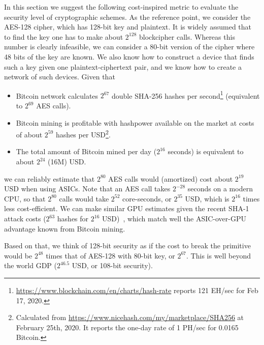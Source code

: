 \documentclass[a4paper]{article}
\begin{document}
In this section we suggest the following cost-inspired metric to evaluate the security level of cryptographic schemes. As the reference point, we consider the AES-128 cipher, which has 128-bit key and plaintext. It is widely assumed that to find the key one has to make about $2^{128}$ blockcipher calls. Whereas this number is clearly infeasible, we can consider a 80-bit version of the cipher where 48 bits of the key are known.  We also know how to construct a device that finds such a key given one plaintext-ciphertext pair, and we know how to create a network of such devices.
Given that
\begin{itemize}
    \item Bitcoin network calculates $2^{67}$ double SHA-256 hashes per second\footnote{\url{https://www.blockchain.com/en/charts/hash-rate} reports 121 EH/sec for Feb 17, 2020.} (equivalent to $2^{69}$ AES calls).
    \item Bitcoin mining is profitable with hashpower available on the market at costs of about $2^{59}$ hashes per USD\footnote{Calculated from \url{https://www.nicehash.com/my/marketplace/SHA256} at February 25th, 2020. It reports the one-day rate of 1 PH/sec for 0.0165 Bitcoin.}.
    \item The total amount of Bitcoin mined per day ($2^{16}$ seconds) is equivalent to about $2^{24}$ (16M) USD.
\end{itemize}
we can reliably estimate that $2^{80}$ AES calls would (amortized) cost about  $2^{19}$ USD when using ASICs. Note that an AES call takes $2^{-28}$ seconds on a modern CPU, so that $2^{80}$ calls would take $2^{52}$ core-seconds, or $2^{35}$ USD, which is $2^{16}$ times less cost-efficient. 
We can make similar GPU estimates given the recent SHA-1 attack costs ($2^{63}$ hashes for $2^{16}$ USD)~\cite{cryptoeprint:2020:014}, which match well the ASIC-over-GPU advantage known from Bitcoin mining.

Based on that, we think of 128-bit security as if the cost to break the primitive would be $2^{48}$ times that of AES-128 with 80-bit key, or $2^{67}$. This is well beyond the world GDP ($2^{46.5}$ USD, or 108-bit security). 
\end{document}
